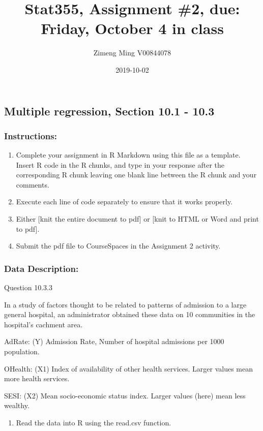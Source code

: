 \documentclass[11pt,]{article}
\title{Stat355, Assignment \#2, due: Friday, October 4 in class}
\author{Zimeng Ming V00844078}
\date{2019-10-02}
\providecommand{\tightlist}{%
  \setlength{\itemsep}{0pt}\setlength{\parskip}{0pt}}
\begin{document}
\maketitle

\subsection{Multiple regression, Section 10.1 -
10.3}\label{multiple-regression-section-10.1---10.3}

\subsubsection{Instructions:}\label{instructions}

\begin{enumerate}
\def\labelenumi{\arabic{enumi}.}
\tightlist
\item
  Complete your assignment in R Markdown using this file as a template.
  Insert R code in the R chunks, and type in your response after the
  corresponding R chunk leaving one blank line between the R chunk and
  your comments.
\item
  Execute each line of code separately to ensure that it works properly.
\item
  Either {[}knit the entire document to pdf{]} or {[}knit to HTML or
  Word and print to pdf{]}.
\item
  Submit the pdf file to CourseSpaces in the Assignment 2 activity.
\end{enumerate}

\subsubsection{Data Description:}\label{data-description}

Question 10.3.3

In a study of factors thought to be related to patterns of admission to
a large general hospital, an administrator obtained these data on 10
communities in the hospital's cachment area.

AdRate: (Y) Admission Rate, Number of hospital admissions per 1000
population.

OHealth: (X1) Index of availability of other health services. Larger
values mean more health services.

SESI: (X2) Mean socio-economic status index. Larger values (here) mean
less wealthy.

\begin{enumerate}
\def\labelenumi{\arabic{enumi}.}
\setcounter{enumi}{-1}
\tightlist
\item
  Read the data into R using the read.csv function.
\end{enumerate}
\end{document}
